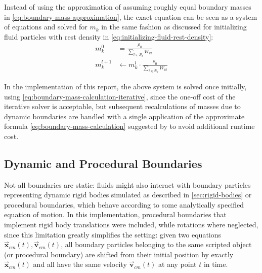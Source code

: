 \documentclass[oneside, a4paper]{book}
\newcommand\vek[1]{\vec{\bm{#1}}}
\begin{document}
    Instead of using the approximation of assuming roughly equal boundary masses in \autoref{eq:boundary-mass-approximation}, the exact equation can be seen as a system of equations and solved for $m_k$ in the same fashion as discussed for initializing fluid particles with rest density in \autoref{eq:initializing-fluid-rest-density}:
    \begin{align}
      m_k^0 &= \frac{\rho_0}{\sum_{l\in\mathcal{B}_k} W_{kl}}\\
      m_k^{l+1} &\gets m_k^l \cdot \frac{\rho_0}{\sum_{l\in\mathcal{B}_k} W_{kl}}\label{eq:boundary-mass-calculation-iterative}
    \end{align}

    In the implementation of this report, the above system is solved once initially, using \autoref{eq:boundary-mass-calculation-iterative}, since the one-off cost of the iterative solver is acceptable, but subsequent recalculations of masses due to dynamic boundaries are handled with a single application of the approximate formula \autoref{eq:boundary-mass-calculation} suggested by \autocite[Akinci et al.]{versatile-boundary-akinci} to avoid additional runtime cost.
    
    \subsection{Dynamic and Procedural Boundaries}\label{sec:dynamic-and-procedural-bdy}
    Not all boundaries are static: fluids might also interact with boundary particles representing dynamic rigid bodies simulated as described in \autoref{sec:rigid-bodies} or procedural boundaries, which behave according to some analytically specified equation of motion. In this implementation, procedural boundaries that implement rigid body translations were included, while rotations where neglected, since this limitation greatly simplifies the setting: given two equations $\vek{x}_{cm}(t), \vek{v}_{cm}(t)$, all boundary particles belonging to the same scripted object (or procedural boundary) are shifted from their initial position by exactly $\vek{x}_{cm}(t)$ and all have the same velocity $\vek{v}_{cm}(t)$ at any point $t$ in time. 
\end{document}
